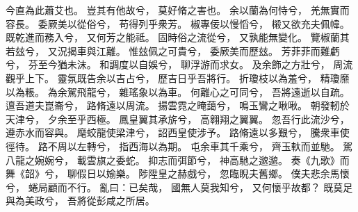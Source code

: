 \begin{pinyinscope}
今直為此蕭艾也。
豈其有他故兮，
莫好脩之害也。
余以蘭為何恃兮，
羌無實而容長。
委厥美以從俗兮，
苟得列乎衆芳。
椒專佞以慢慆兮，
樧又欲充夫佩幃。
既乾進而務入兮，
又何芳之能祗。
固時俗之流從兮，
又孰能無變化。
覽椒蘭其若玆兮，
又況揭車與江離。
惟玆佩之可貴兮，
委厥美而歷玆。
芳菲菲而難虧兮，
芬至今猶未沫。
和調度以自娛兮，
聊浮游而求女。
及余飾之方壯兮，
周流觀乎上下。
靈氛既告余以吉占兮，
歷吉日乎吾將行。
折瓊枝以為羞兮，
精瓊爢以為粻。
為余駕飛龍兮，
雜瑤象以為車。
何離心之可同兮，
吾將遠逝以自疏。
邅吾道夫崑崙兮，
路脩遠以周流。
揚雲霓之晻藹兮，
鳴玉鸞之啾啾。
朝發軔於天津兮，
夕余至乎西極。
鳳皇翼其承旂兮，
高翱翔之翼翼。
忽吾行此流沙兮，
遵赤水而容與。
麾蛟龍使梁津兮，
詔西皇使涉予。
路脩遠以多艱兮，
騰衆車使徑待。
路不周以左轉兮，
指西海以為期。
屯余車其千乘兮，
齊玉軑而並馳。
駕八龍之婉婉兮，
載雲旗之委蛇。
抑志而弭節兮，
神高馳之邈邈。
奏《九歌》而舞《韶》兮，
聊假日以媮樂。
陟陞皇之赫戲兮，
忽臨睨夫舊鄉。
僕夫悲余馬懷兮，
蜷局顧而不行。
亂曰：已矣哉，
國無人莫我知兮，
又何懷乎故都？
既莫足與為美政兮，
吾將從彭咸之所居。

\end{pinyinscope}